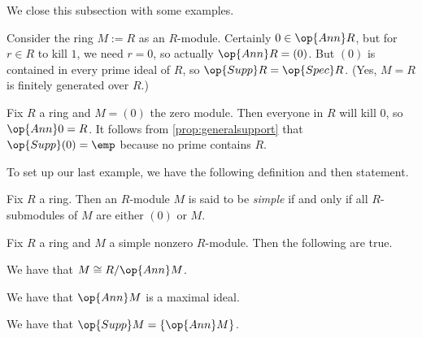 We close this subsection with some examples.
\begin{example}
	Consider the ring $M:=R$ as an $R$-module. Certainly $0\in\op{Ann}R$, but for $r\in R$ to kill $1$, we need $r=0$, so actually $\op{Ann}R=(0)$. But $(0)$ is contained in every prime ideal of $R$, so $\op{Supp}R=\op{Spec}R$. (Yes, $M=R$ is finitely generated over $R$.)
\end{example}
\begin{ex} \label{ex:emptysupport}
	Fix $R$ a ring and $M=(0)$ the zero module. Then everyone in $R$ will kill $0$, so $\op{Ann}0=R$. It follows from \autoref{prop:generalsupport} that $\op{Supp}(0)=\emp$ because no prime contains $R$.
\end{ex}
To set up our last example, we have the following definition and then statement.
\begin{definition}[Simple]
	Fix $R$ a ring. Then an $R$-module $M$ is said to be \textit{simple} if and only if all $R$-submodules of $M$ are either $(0)$ or $M$.
\end{definition}
\begin{exe}
	Fix $R$ a ring and $M$ a simple nonzero $R$-module. Then the following are true.
	\begin{listalph}
		\item We have that $M\cong R/\op{Ann}M$.
		\item We have that $\op{Ann}M$ is a maximal ideal.
		\item We have that $\op{Supp}M=\{\op{Ann}M\}$.
	\end{listalph}
\end{exe}
